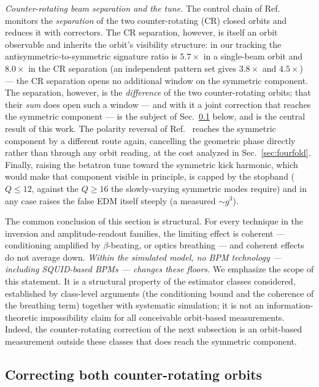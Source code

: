 \documentclass[aps,prab,reprint,superscriptaddress,nofootinbib]{revtex4-2}
\begin{document}
\emph{Counter-rotating beam separation and the tune.}  The control chain of
Ref.~\cite{omarov} monitors the \emph{separation} of the two counter-rotating
(CR) closed orbits and reduces it with correctors.  The CR separation,
however, is itself an orbit observable and inherits the orbit's visibility
structure: in our tracking the antisymmetric-to-symmetric signature ratio is
$5.7\times$ in a single-beam orbit and $8.0\times$ in the CR separation (an
independent pattern set gives $3.8\times$ and $4.5\times$) --- the CR
separation opens no additional window on the
symmetric component.  The separation, however, is the \emph{difference} of the
two counter-rotating orbits; that their \emph{sum} does open such a window ---
and with it a joint correction that reaches the symmetric component --- is the
subject of Sec.~\ref{sec:polarity} below, and is the central result of this
work.  The polarity reversal of Ref.~\cite{omarov} reaches the symmetric
component by a different route again, cancelling the geometric phase directly
rather than through any orbit reading, at the cost analyzed in
Sec.~\ref{sec:fourfold}.  Finally, raising
the betatron tune toward the symmetric kick harmonic, which would make that
component visible in principle, is capped by the stopband ($Q \leq 12$,
against the $Q \geq 16$ the slowly-varying symmetric modes require) and in
any case raises the false EDM itself steeply (a measured $\sim\!g^{3}$).

The common conclusion of this section is structural.  For every technique in
the inversion and amplitude-readout families, the limiting effect is
coherent --- conditioning amplified by $\beta$-beating, or optics
breathing --- and coherent effects do not average down.  \emph{Within the
simulated model, no BPM technology --- including SQUID-based BPMs --- changes
these floors.}  We emphasize
the scope of this statement.  It is a structural property of the estimator
classes considered, established by class-level arguments (the conditioning
bound and the coherence of the breathing term) together with systematic
simulation; it is not an information-theoretic impossibility claim for all
conceivable orbit-based measurements.  Indeed, the counter-rotating correction
of the next subsection is an orbit-based measurement outside these classes that
does reach the symmetric component.

\subsection{Correcting both counter-rotating orbits}
\label{sec:polarity}
\end{document}

